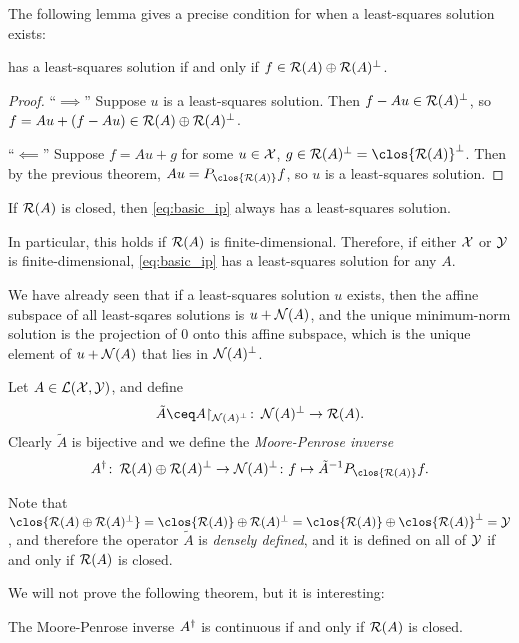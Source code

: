 The following lemma gives a precise condition for when a least-squares solution exists: 
\begin{lemma}
     has a least-squares solution if and only if $f \in \operatorname{\mathcal R}(A) \oplus \operatorname{\mathcal R}(A)^\perp$. 
\end{lemma}

\begin{proof}
    ``$\implies$'' Suppose $u$ is a least-squares solution. Then $f - Au \in \operatorname{\mathcal R}(A)^\perp$, so $f = Au + (f - Au) \in \operatorname{\mathcal R}(A) \oplus \operatorname{\mathcal R}(A)^\perp$.
    
    ``$\impliedby$'' Suppose $f = Au + g$ for some $u \in \mathcal X$, $g \in \Ran(A)\P = \clos{\Ran(A)}\P$. Then by the previous theorem, $Au = P_{\clos{\Ran(A)}}f$, so $u$ is a least-squares solution. 
\end{proof}

\begin{corollary}
    If $\operatorname{\mathcal R}(A)$ is closed, then \cref{eq:basic_ip} always has a least-squares solution. 
\end{corollary}
In particular, this holds if $\operatorname{\mathcal R}(A)$ is finite-dimensional. Therefore, if either $\mathcal X$ or $\mathcal Y$ is finite-dimensional, \cref{eq:basic_ip} has a least-squares solution for any $A$. 

We have already seen that if a least-squares solution $u$ exists, then the affine subspace of all least-sqares solutions is $u + \operatorname{\mathcal N}(A)$, and the unique minimum-norm solution is the projection of 0 onto this affine subspace, which is the unique element of $u + \operatorname{\mathcal N}(A)$ that lies in $\operatorname{\mathcal N}(A)^\perp$. 

\begin{definition}
    Let $A \in \mathcal L(\mathcal X, \mathcal Y)$, and define
    \[
    \tilde A \ceq A \restr_{\Nul(A)\P} \colon \Nul(A)\P \to \Ran(A). 
    \]
    Clearly $\tilde A$ is bijective and we define the \emph{Moore-Penrose inverse} 
    \[
    A\D \colon \Ran(A) \oplus \Ran(A)\P \to \Nul(A)\P \colon f \mapsto \tilde A^{-1} P_{\clos{\Ran(A)}} f. 
    \]
\end{definition}

\begin{remark}
    Note that $\clos{\Ran(A) \oplus \Ran(A)\P} = \clos{\Ran(A)} \oplus \Ran(A)\P = \clos{\Ran(A)} \oplus \clos{\Ran(A)}\P = \YY$, and therefore the operator $\tilde A$ is \emph{densely defined}, and it is defined on all of $
    \mathcal Y$ if and only if $\operatorname{\mathcal R}(A)$ is closed. 
\end{remark}

We will not prove the following theorem, but it is interesting: 
\begin{theorem} \label{thm:mp_inverse_continuous}
    The Moore-Penrose inverse $A^\dagger$ is continuous if and only if $\operatorname{\mathcal R}(A)$ is closed. 
\end{theorem}

